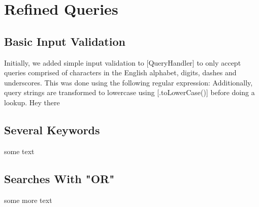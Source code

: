 \section{Refined Queries}

\subsection{Basic Input Validation}
Initially, we added simple input validation to [QueryHandler] to only accept queries comprised of characters in the English alphabet, digits, dashes and underscores. This was done using the following regular expression: \code{[\\\\b([-\\\\w]+)\\\\b]}
Additionally, query strings are transformed to lowercase using [.toLowerCase()] before doing a lookup. Hey there

\subsection{Several Keywords}
some text 

\subsection{Searches With "OR"}
some more text
